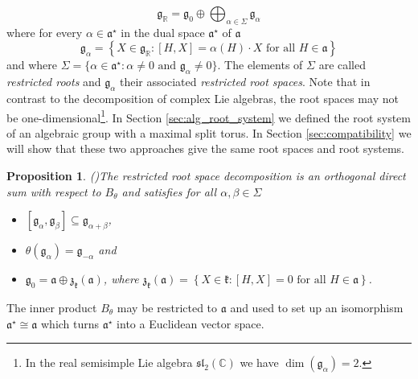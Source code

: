 \documentclass[12pt]{amsart}
\newcommand{\R}{\mathbb{R} }
\newcommand{\C}{\mathbb{C} }
\newcommand{\frakg}{\mathfrak{g}}
\newcommand{\frakk}{\mathfrak{k}}
\newcommand{\fraka}{\mathfrak{a}}
\numberwithin{equation}{section}
\newtheorem{proposition}[theorem]{Proposition}
\theoremstyle{remark} %
\begin{document}
$$
\frakg_\R = \frakg_0 \oplus\bigoplus_{\alpha \in \Sigma}\frakg_\alpha 
$$  
where for every $\alpha \in \fraka^\star$ in the dual space $\fraka^\star$ of $\fraka$
$$
\frakg_\alpha = \left\{ X \in \frakg_\R \colon [H,X] = \alpha(H) \cdot X \text{ for all } H \in \fraka  \right\}
$$
and where $\Sigma = \{\alpha \in \fraka^\star \colon \alpha \neq 0 \text{ and } \frakg_\alpha \neq 0\}$. The elements of $\Sigma$ are called \emph{restricted roots} and $\frakg_\alpha$ their associated \emph{restricted root spaces}. Note that in contrast to the decomposition of complex Lie algebras, the root spaces may not be one-dimensional\footnote{In the real semisimple Lie algebra $\mathfrak{sl}_2(\C)$ we have $\operatorname{dim}(\frakg_\alpha) = 2$.}. In Section \ref{sec:alg_root_system} we defined the root system of an algebraic group with a maximal split torus. In Section \ref{sec:compatibility} we will show that these two approaches give the same root spaces and root systems.
\begin{proposition}(\cite[Proposition 6.40]{Kna})\label{prop:root_decomp} 
	The \emph{restricted root space decomposition} is an orthogonal direct sum with respect to $B_\theta$ and satisfies for all $\alpha,\beta \in \Sigma$
	\begin{itemize}
		\item [(i)] $
		[\frakg_{\alpha}, \frakg_{\beta}] \subseteq \frakg_{\alpha + \beta}$,
		\item [(ii)]$\theta (\frakg_\alpha) = \frakg_{-\alpha}$ and
		\item [(iii)]$\frakg_0 = \fraka \oplus \mathfrak{z}_\frakk(\fraka)$, where $ \mathfrak{z}_\frakk(\fraka) = \left\{X\in \frakk \colon [H,X] = 0  \text{ for all } H \in \fraka \right\}$.
	\end{itemize}
\end{proposition}

The inner product $B_{\theta}$ may be restricted to $\fraka$ and used to set up an isomorphism $\fraka^{\star} \cong \fraka$ which turns $\fraka^{\star}$ into a Euclidean vector space.
\end{document}
